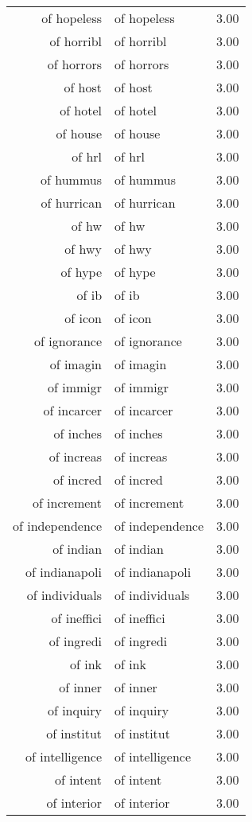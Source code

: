 \begin{table}[ht]
\begin{tabular}{rlr}
  of hopeless & of hopeless & 3.00 \\ 
  of horribl & of horribl & 3.00 \\ 
  of horrors & of horrors & 3.00 \\ 
  of host & of host & 3.00 \\ 
  of hotel & of hotel & 3.00 \\ 
  of house & of house & 3.00 \\ 
  of hrl & of hrl & 3.00 \\ 
  of hummus & of hummus & 3.00 \\ 
  of hurrican & of hurrican & 3.00 \\ 
  of hw & of hw & 3.00 \\ 
  of hwy & of hwy & 3.00 \\ 
  of hype & of hype & 3.00 \\ 
  of ib & of ib & 3.00 \\ 
  of icon & of icon & 3.00 \\ 
  of ignorance & of ignorance & 3.00 \\ 
  of imagin & of imagin & 3.00 \\ 
  of immigr & of immigr & 3.00 \\ 
  of incarcer & of incarcer & 3.00 \\ 
  of inches & of inches & 3.00 \\ 
  of increas & of increas & 3.00 \\ 
  of incred & of incred & 3.00 \\ 
  of increment & of increment & 3.00 \\ 
  of independence & of independence & 3.00 \\ 
  of indian & of indian & 3.00 \\ 
  of indianapoli & of indianapoli & 3.00 \\ 
  of individuals & of individuals & 3.00 \\ 
  of ineffici & of ineffici & 3.00 \\ 
  of ingredi & of ingredi & 3.00 \\ 
  of ink & of ink & 3.00 \\ 
  of inner & of inner & 3.00 \\ 
  of inquiry & of inquiry & 3.00 \\ 
  of institut & of institut & 3.00 \\ 
  of intelligence & of intelligence & 3.00 \\ 
  of intent & of intent & 3.00 \\ 
  of interior & of interior & 3.00 \\ 

\end{tabular}
\end{table}
